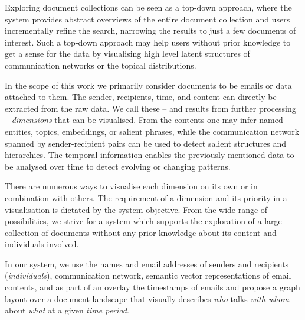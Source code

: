 Exploring document collections can be seen as a top-down approach, where the system provides abstract overviews of the entire document collection and users incrementally refine the search, narrowing the results to just a few documents of interest.
Such a top-down approach may help users without prior knowledge to get a sense for the data by visualising high level latent structures of communication networks or the topical distributions.

In the scope of this work we primarily consider documents to be emails or data attached to them.
The sender, recipients, time, and content can directly be extracted from the raw data.
We call these -- and results from further processing -- \textit{dimensions} that can be visualised.
From the contents one may infer named entities, topics, embeddings, or salient phrases, while the communication network spanned by sender-recipient pairs can be used to detect salient structures and hierarchies.
The temporal information enables the previously mentioned data to be analysed over time to detect evolving or changing patterns.

There are numerous ways to visualise each dimension on its own or in combination with others.
The requirement of a dimension and its priority in a visualisation is dictated by the system objective.
From the wide range of possibilities, we strive for a system which supports the exploration of a large collection of documents without any prior knowledge about its content and individuals involved.

In our system, we use the names and email addresses of senders and recipients (\textit{individuals}), communication network, semantic vector representations of email contents, and as part of an overlay the timestamps of emails and propose a graph layout over a document landscape that visually describes \textit{who} talks \textit{with whom} about \textit{what} at a given \textit{time period}. 

